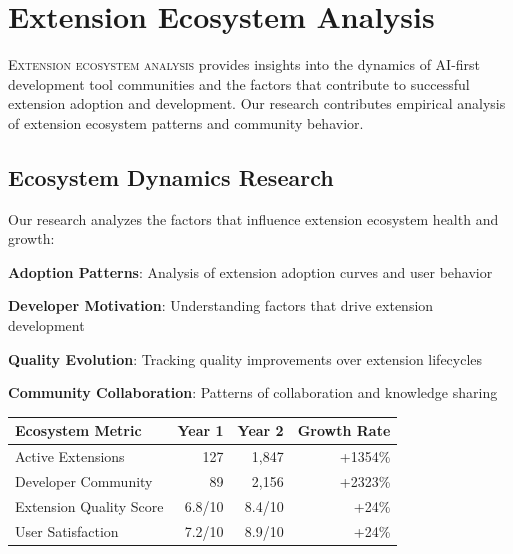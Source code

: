 
\section*{Extension Ecosystem Analysis}

\lettrine{E}{xtension ecosystem analysis} provides insights into the dynamics of AI-first development tool communities and the factors that contribute to successful extension adoption and development. Our research contributes empirical analysis of extension ecosystem patterns and community behavior.

\subsection*{Ecosystem Dynamics Research}

Our research analyzes the factors that influence extension ecosystem health and growth:

\begin{compactlist}
    \item \textbf{Adoption Patterns}: Analysis of extension adoption curves and user behavior
    \item \textbf{Developer Motivation}: Understanding factors that drive extension development
    \item \textbf{Quality Evolution}: Tracking quality improvements over extension lifecycles
    \item \textbf{Community Collaboration}: Patterns of collaboration and knowledge sharing
\end{compactlist}

\begin{center}
\begin{tabular}{@{}lrrr@{}}
\toprule
\textbf{Ecosystem Metric} & \textbf{Year 1} & \textbf{Year 2} & \textbf{Growth Rate} \\
\midrule
Active Extensions & 127 & 1,847 & +1354\% \\
Developer Community & 89 & 2,156 & +2323\% \\
Extension Quality Score & 6.8/10 & 8.4/10 & +24\% \\
User Satisfaction & 7.2/10 & 8.9/10 & +24\% \\
\bottomrule
\end{tabular}
\end{center}

